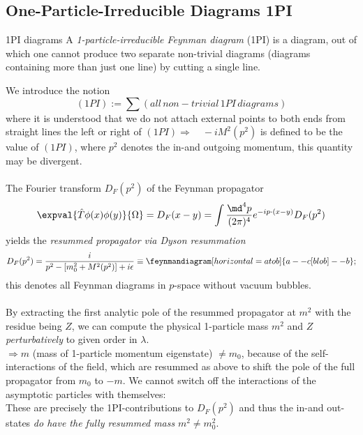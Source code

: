 \subsection{One-Particle-Irreducible Diagrams   1PI}
\begin{mybox}{1PI diagrams}
	A \emph{1-particle-irreducible Feynman diagram} (1PI) is a diagram, out of which one cannot produce two separate non-trivial diagrams (diagrams containing more than just one line) by cutting a single line.
\end{mybox}
We introduce the notion
\begin{equation}
	(1PI) := \sum(all\, non-trivial\, 1PI\, diagrams)
\end{equation}
where it is understood that we do not attach external points to both ends from straight lines the left or right of $(1PI) \Rightarrow \quad -i M^2(p^2)$ is defined to be the value of $(1PI)$, where $p^2$ denotes the in-and outgoing momentum, this quantity may be divergent.\\
\\
The Fourier transform $D_F(p^2)$ of the Feynman propagator 
\begin{equation}
	\expval{\hat{T}\phi(x)  \phi(y)}{\Omega} = D_F(x-y) = \int \frac{\md^4 p}{(2\pi)^4} e^{- i p \cdot (x-y)} D_F(p^2)
\end{equation}
yields the \emph{resummed propagator via Dyson resummation}
\begin{equation}
	D_F(p^2) = \frac{i}{p^2 - [m^2_0 + M^2(p^2)] + i \epsilon} \equiv
	 \feynmandiagram [horizontal=a to b] {a -- c [blob]--b};
\end{equation}
this denotes all Feynman diagrams in $p$-space without vacuum bubbles.\\
\\
By extracting the first analytic pole of the resummed propagator at $m^2$ with the residue being $Z$, we can compute the physical 1-particle mass $m^2$ and $Z$ \emph{perturbatively} to given order in $\lambda$.\\
$\Rightarrow m$ (mass of 1-particle momentum eigenstate) $\neq m_0$, because of the self-interactions of the field, which are resummed as above to shift the pole of the full propagator from $m_0$ to $-m$. We cannot switch off the interactions of the asymptotic particles with themselves:\\
These are precisely the 1PI-contributions to $D_F(p^2)$ and thus the in-and out-states  \emph{do have the fully resummed mass} $m^2\neq m^2_0$.

